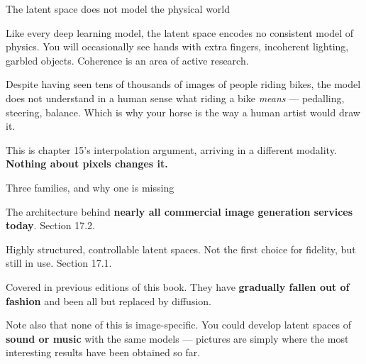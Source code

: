 \documentclass[aspectratio=169,11pt,t]{beamer}
\begin{document}
\begin{frame}[shrink=25]{The latent space does not model the physical world}
{\fontsize{9.4}{12.6}\selectfont\color{fg2}Like every deep learning model, the latent space encodes no consistent model of physics. You will occasionally see hands with extra fingers, incoherent lighting, garbled objects. Coherence is an area of active research.\par}\vskip 4pt
\begin{iband}[amber]
Despite having seen tens of thousands of images of people riding bikes, the model does not understand in a human sense what riding a bike \textit{means} --- pedalling, steering, balance. Which is why your horse is  the way a human artist would draw it.
\end{iband}
{\fontsize{9.4}{12.6}\selectfont\color{fg2}This is chapter 15's interpolation argument, arriving in a different modality. \textbf{Nothing about pixels changes it.}\par}\vskip 4pt
\end{frame}

\begin{frame}[shrink=25]{Three families, and why one is missing}
\begin{minipage}[t]{0.3253\textwidth}
\begin{icardaccent}
The architecture behind \textbf{nearly all commercial image generation services today}. Section 17.2.
\end{icardaccent}
\end{minipage}%
\hfill
\begin{minipage}[t]{0.3253\textwidth}
\begin{icardaccent}
Highly structured, controllable latent spaces. Not the first choice for fidelity, but still in use. Section 17.1.
\end{icardaccent}
\end{minipage}%
\hfill
\begin{minipage}[t]{0.3253\textwidth}
\begin{icard}
Covered in previous editions of this book. They have \textbf{gradually fallen out of fashion} and been all but replaced by diffusion.
\end{icard}
\end{minipage}%
{\fontsize{9.4}{12.6}\selectfont\color{fg2}Note also that none of this is image-specific. You could develop latent spaces of \textbf{sound or music} with the same models --- pictures are simply where the most interesting results have been obtained so far.\par}\vskip 4pt
\end{frame}
\end{document}
